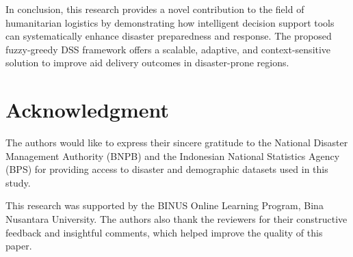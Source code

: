 \documentclass[conference,final,a4paper,twoside,10pt]{IEEEtran}
\begin{document}
In conclusion, this research provides a novel contribution to the field of humanitarian logistics by demonstrating how intelligent decision support tools can systematically enhance disaster preparedness and response. The proposed fuzzy-greedy DSS framework offers a scalable, adaptive, and context-sensitive solution to improve aid delivery outcomes in disaster-prone regions.


\section*{Acknowledgment}

The authors would like to express their sincere gratitude to the National Disaster Management Authority (BNPB) and the Indonesian National Statistics Agency (BPS) for providing access to disaster and demographic datasets used in this study. 

This research was supported by the BINUS Online Learning Program, Bina Nusantara University. The authors also thank the reviewers for their constructive feedback and insightful comments, which helped improve the quality of this paper.





 




\label{lastPage}
\end{document}
